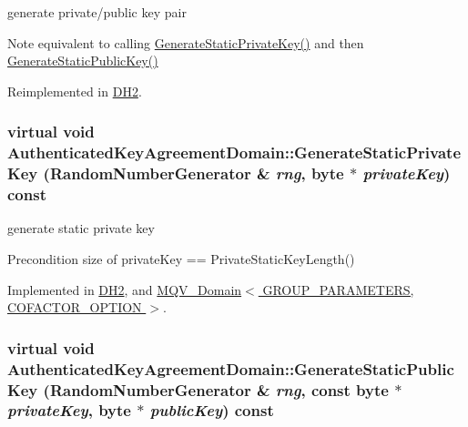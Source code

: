 generate private/public key pair \begin{DoxyNote}{Note}
equivalent to calling \hyperlink{class_authenticated_key_agreement_domain_a00d9b12028e9ecb61af6d0f312965c6f}{GenerateStaticPrivateKey()} and then \hyperlink{class_authenticated_key_agreement_domain_a853885a901ac7c4f8c51fd177df5d96c}{GenerateStaticPublicKey()} 
\end{DoxyNote}


Reimplemented in \hyperlink{class_d_h2_aa4a447f81fcdcc656fe4fc5b6e99dc2e}{DH2}.\hypertarget{class_authenticated_key_agreement_domain_a00d9b12028e9ecb61af6d0f312965c6f}{
\subsubsection[{GenerateStaticPrivateKey}]{\setlength{\rightskip}{0pt plus 5cm}virtual void AuthenticatedKeyAgreementDomain::GenerateStaticPrivateKey ({\bf RandomNumberGenerator} \& {\em rng}, \/  byte $\ast$ {\em privateKey}) const}}
\label{class_authenticated_key_agreement_domain_a00d9b12028e9ecb61af6d0f312965c6f}


generate static private key \begin{DoxyPrecond}{Precondition}
size of privateKey == PrivateStaticKeyLength() 
\end{DoxyPrecond}


Implemented in \hyperlink{class_d_h2_a05de579e63f552a103208bd7fdd23440}{DH2}, and \hyperlink{class_m_q_v___domain_a11bfbdb30b9a6776f2827ba200d5af50}{MQV\_\-Domain$<$ GROUP\_\-PARAMETERS, COFACTOR\_\-OPTION $>$}.\hypertarget{class_authenticated_key_agreement_domain_a853885a901ac7c4f8c51fd177df5d96c}{
\subsubsection[{GenerateStaticPublicKey}]{\setlength{\rightskip}{0pt plus 5cm}virtual void AuthenticatedKeyAgreementDomain::GenerateStaticPublicKey ({\bf RandomNumberGenerator} \& {\em rng}, \/  const byte $\ast$ {\em privateKey}, \/  byte $\ast$ {\em publicKey}) const}}
\label{class_authenticated_key_agreement_domain_a853885a901ac7c4f8c51fd177df5d96c}


